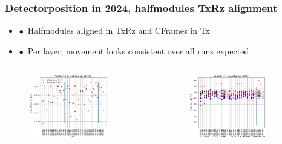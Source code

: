 \documentclass[aspectratio=1610, 12pt, xcolor=dvipsnames]{beamer}
\begin{document}
\begin{frame}\frametitle{Detectorposition in 2024, halfmodules TxRz alignment}
  \begin{itemize}
    \setlength\itemsep{0em}
    \item $\bullet$\, Halfmodules aligned in TxRz and CFrames in Tx
    \item $\bullet$\, Per layer, movement looks consistent over all runs \to expected
  \end{itemize}
  \begin{columns}
    \begin{column}[c]{0.5\textwidth}
      \begin{figure}
        \centering
        \includegraphics[width=0.8\textwidth]{plots/2025_plots_goettingen/scifi_stability_TxRz/half/stabi_test_Tx_half_correct.pdf}
      \end{figure}
    \end{column}
    \begin{column}[c]{0.5\textwidth}
      \begin{figure}
        \centering
        \includegraphics[width=0.8\textwidth]{plots/2025_plots_goettingen/scifi_stability_TxRz/per_layer/stabi_test_Tx_per_layer.pdf}
      \end{figure}
    \end{column}
  \end{columns}
\end{frame}
\end{document}
